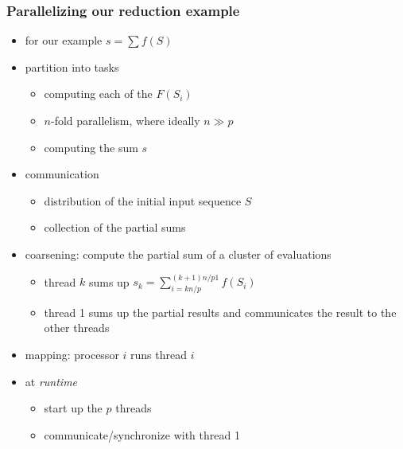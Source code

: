 \begin{frame}[fragile]
%
  \frametitle{Parallelizing our reduction example}
%
  \begin{itemize}
%
    \item for our example $s = \sum f(S)$
    \item partition into tasks
      \begin{itemize}
      \item computing each of the $F(S_{i})$
      \item $n$-fold parallelism, where ideally $n \gg p$ 
      \item computing the sum $s$
      \end{itemize}
%
    \item communication
      \begin{itemize}
        \item distribution of the initial input sequence $S$
        \item collection of the partial sums
      \end{itemize}
%
    \item coarsening: compute the partial sum of a cluster of evaluations
      \begin{itemize}
        \item thread $k$ sums up $s_{k} = \sum_{i = k n/p}^{(k+1)n/p 1} f(S_{i})$
        \item thread 1 sums up the partial results and communicates the result to the other
          threads
      \end{itemize}
%
    \item mapping: processor $i$ runs thread $i$
%
    \item at {\em runtime}
      \begin{itemize}
        \item start up the $p$ threads
        \item communicate/synchronize with thread 1
      \end{itemize}
%
  \end{itemize}
%
\end{frame}

